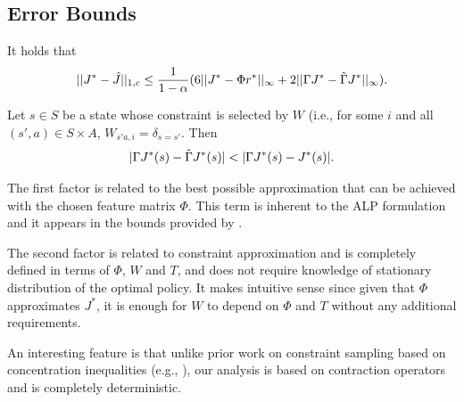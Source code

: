 %
\subsection{Error Bounds}
\begin{theorem}
\label{cmt2mn}
It holds that
\begin{align*}%
\begin{split}
||J^*-\hj||_{1,c}
\leq\frac{1}{1-\alpha}(6 ||J^*-\Phi r^*||_{\infty}
+2||\Gamma J^*-\hg J^*||_{\infty}).
\end{split}
\end{align*}
\end{theorem}
\begin{comment}
\begin{theorem}[Control Error Bound in $\norm{\cdot}_{\infty}$]
\label{polthe}
Let $\hu$ be the greedy policy with respect to the solution $\hj$ of the GRLP and $J_{\hu}$ be its value function.
Then,
\begin{align}\label{polthebnd}
\norm{J^* - J_{\hu}}_{1,c}
&\leq 2\left(\frac{c^\top \psi}{(1-\beta_{\psi})^2}\right)\, \big( 2||J^*-\Phi r^*||_{\infty}
\nn\\&
+||\Gamma J^*-\hg J^*||_{\infty}+||\hj-\hg\hj||_{\infty}\big).
\end{align}
\end{theorem}
\end{comment}
\begin{theorem}\label{st}
Let $s\in S$ be a state whose constraint is selected by $W$ (i.e., for some $i$ and all $(s',a)\in S\times A$,
$W_{s'a,i}=\delta_{s=s'}$.
Then
\begin{align*}%
|\Gamma J^*(s)-\hg J^*(s)|<|\Gamma J^*(s)-J^*(s)|.
\end{align*}
\end{theorem}
The first factor is related to the best possible approximation that can be achieved with the chosen feature matrix $\Phi$. This term is inherent to the ALP formulation and it appears in the bounds provided by \cite{ALP}.\par
The second factor is related to constraint approximation and is completely defined in terms of $\Phi$, $W$ and $T$, and does not require knowledge of stationary distribution of the optimal policy. It makes intuitive sense since given that $\Phi$ approximates $J^*$, it is enough for $W$ to depend on $\Phi$ and $T$ without any additional requirements.\par An interesting feature is that unlike prior work on constraint sampling based on concentration inequalities (e.g.,  \cite{CS}), our analysis is based on contraction operators and is completely deterministic.
